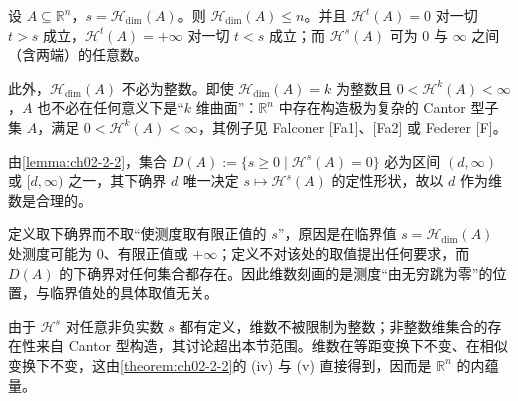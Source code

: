 \documentclass[../../main.tex]{subfiles}%
\begin{document}
\begin{remark}\label{remark:ch02-def-2-2-注记}
设 $A\subseteq\mathbb{R}^n$，$s=\mathcal{H}_{\dim}(A)$。则 $\mathcal{H}_{\dim}(A)\leqslant n$。并且 $\mathcal{H}^t(A)=0$ 对一切 $t>s$ 成立，$\mathcal{H}^t(A)=+\infty$ 对一切 $t<s$ 成立；而 $\mathcal{H}^s(A)$ 可为 $0$ 与 $\infty$ 之间（含两端）的任意数。

此外，$\mathcal{H}_{\dim}(A)$ 不必为整数。即使 $\mathcal{H}_{\dim}(A)=k$ 为整数且 $0<\mathcal{H}^k(A)<\infty$，$A$ 也不必在任何意义下是“$k$ 维曲面”：$\mathbb{R}^n$ 中存在构造极为复杂的 Cantor 型子集 $A$，满足 $0<\mathcal{H}^k(A)<\infty$，其例子见 Falconer [Fa1]、[Fa2] 或 Federer [F]。
\end{remark}

\begin{remark}\label{remark:ch02-def-2-2-动机}
由\cref{lemma:ch02-2-2}，集合 $D(A):=\{s\geqslant0\mid\mathcal{H}^s(A)=0\}$ 必为区间 $(d,\infty)$ 或 $[d,\infty)$ 之一，其下确界 $d$ 唯一决定 $s\mapsto\mathcal{H}^s(A)$ 的定性形状，故以 $d$ 作为维数是合理的。%

定义取下确界而不取“使测度取有限正值的 $s$”，原因是在临界值 $s=\mathcal{H}_{\dim}(A)$ 处测度可能为 $0$、有限正值或 $+\infty$；定义不对该处的取值提出任何要求，而 $D(A)$ 的下确界对任何集合都存在。因此维数刻画的是测度“由无穷跳为零”的位置，与临界值处的具体取值无关。

由于 $\mathcal{H}^s$ 对任意非负实数 $s$ 都有定义，维数不被限制为整数；非整数维集合的存在性来自 Cantor 型构造，其讨论超出本节范围。维数在等距变换下不变、在相似变换下不变，这由\cref{theorem:ch02-2-2}的 (iv) 与 (v) 直接得到，因而是 $\mathbb{R}^n$ 的内蕴量。%
\end{remark}
\end{document}
